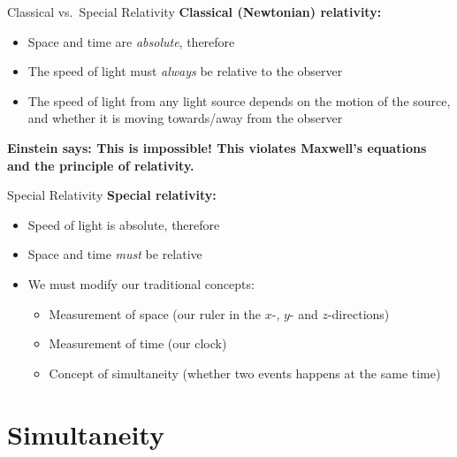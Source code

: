 \documentclass[12pt,compress,aspectratio=169]{beamer}
\begin{document}
\begin{frame}{Classical vs.\ Special Relativity}
  \textbf{Classical (Newtonian) relativity:}
  \begin{itemize}
  \item Space and time are \emph{absolute}, therefore
  \item The speed of light must \emph{always} be relative to the observer
  \item The speed of light from any light source depends on the motion of
    the source, and whether it is moving towards/away from the observer
  \end{itemize}
  \vspace{.2in}
  \textbf{Einstein says: This is impossible! This violates Maxwell's equations
    and the principle of relativity.}
\end{frame}



\begin{frame}{Special Relativity}
  \textbf{Special relativity:}
  \begin{itemize}
  \item Speed of light is absolute, therefore
  \item Space and time \emph{must} be relative
  \item We must modify our traditional concepts:
    \begin{itemize}
    \item Measurement of space (our ruler in the $x$-, $y$- and $z$-directions)
    \item Measurement of time (our clock)
    \item Concept of simultaneity (whether two events happens at the same time)
    \end{itemize}
  \end{itemize}
\end{frame}



\section{Simultaneity}

\end{document}
